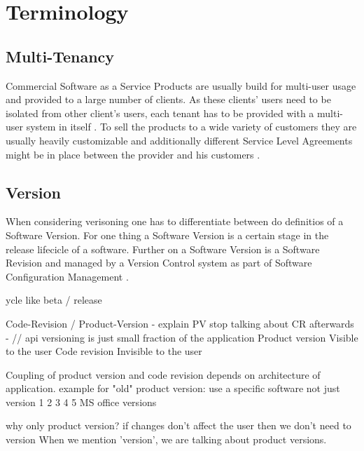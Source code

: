 \section{Terminology}
\label{sec:terminology}

\subsection{Multi-Tenancy}

Commercial Software as a Service Products are usually build for multi-user usage and provided to a large number of clients. As these clients' users need to be isolated from other client's users, each tenant has to be provided with a multi-user system in itself \cite{Chong2006a}. To sell the products to a wide variety of customers they are usually heavily customizable and additionally different Service Level Agreements might be in place between the provider and his customers \cite{Bezemer2010}.

\subsection{Version}

When considering verisoning one has to differentiate between do definitios of a Software Version.
For one thing a Software Version is a certain stage in the release lifecicle of a software.
Further on a Software Version is a Software Revision and managed by a Version Control system as part of Software Configuration Management \cite{swebook}.

ycle like beta / release


Code-Revision / Product-Version
  - explain PV stop talking about CR afterwards
  - // api versioning is just small fraction of the application
  Product version Visible to the user
  Code revision   Invisible to the user

  Coupling of product version and code revision depends on architecture of application.
  example for "old" product version: use a specific software not just version 1 2 3 4 5
  MS office versions

  why only product version?
  if changes don't affect the user then we don't need to version
  When we mention 'version', we are talking about product versions.

